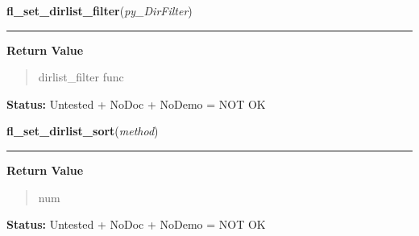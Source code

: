     \label{xformslib:library:fl_set_dirlist_filter}

    \vspace{0.5ex}

\hspace{.8\funcindent}\begin{boxedminipage}{\funcwidth}

    \raggedright \textbf{fl\_set\_dirlist\_filter}(\textit{py\_DirFilter})

    \vspace{-1.5ex}

    \rule{\textwidth}{0.5\fboxrule}
\setlength{\parskip}{2ex}
\setlength{\parskip}{1ex}
      \textbf{Return Value}
    \vspace{-1ex}

      \begin{quote}
      dirlist\_filter func

      \end{quote}

\textbf{Status:} Untested + NoDoc + NoDemo = NOT OK



    \end{boxedminipage}

    \label{xformslib:library:fl_set_dirlist_sort}

    \vspace{0.5ex}

\hspace{.8\funcindent}\begin{boxedminipage}{\funcwidth}

    \raggedright \textbf{fl\_set\_dirlist\_sort}(\textit{method})

    \vspace{-1.5ex}

    \rule{\textwidth}{0.5\fboxrule}
\setlength{\parskip}{2ex}
\setlength{\parskip}{1ex}
      \textbf{Return Value}
    \vspace{-1ex}

      \begin{quote}
      num

      \end{quote}

\textbf{Status:} Untested + NoDoc + NoDemo = NOT OK



    \end{boxedminipage}

